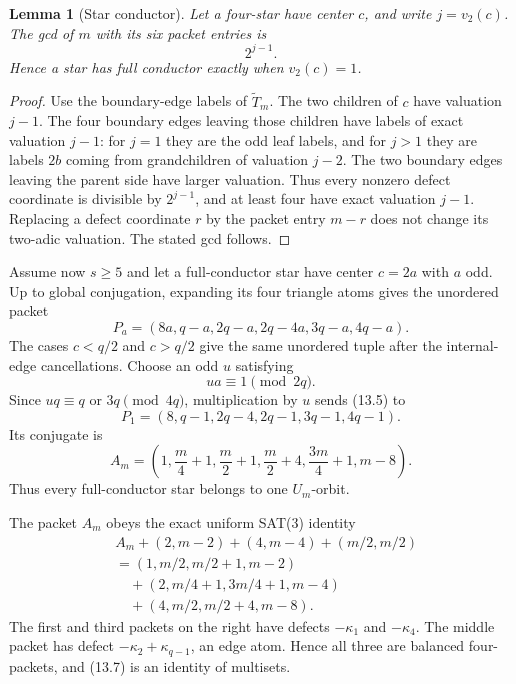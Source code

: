 \documentclass[11pt,oneside]{book}
\newtheorem{lemma}[theorem]{Lemma}
\theoremstyle{definition}
\theoremstyle{remark}
\begin{document}
\begin{lemma}[Star conductor]
Let a four-star have center \(c\), and write \(j=v_2(c)\). The gcd of \(m\) with its six packet entries is
\[
2^{j-1}.
\]
Hence a star has full conductor exactly when \(v_2(c)=1\).
\end{lemma}
\begin{proof}
Use the boundary-edge labels of \(\widetilde T_m\). The two children of \(c\) have valuation \(j-1\). The four boundary edges leaving those children have labels of exact valuation \(j-1\): for \(j=1\) they are the odd leaf labels, and for \(j>1\) they are labels \(2b\) coming from grandchildren of valuation \(j-2\). The two boundary edges leaving the parent side have larger valuation. Thus every nonzero defect coordinate is divisible by \(2^{j-1}\), and at least four have exact valuation \(j-1\). Replacing a defect coordinate \(r\) by the packet entry \(m-r\) does not change its two-adic valuation. The stated gcd follows.
\end{proof}

Assume now \(s\ge5\) and let a full-conductor star have center \(c=2a\) with \(a\) odd. Up to global conjugation, expanding its four triangle atoms gives the unordered packet
\[
P_a=
(8a,q-a,2q-a,2q-4a,3q-a,4q-a).
\tag{13.5}
\]
The cases \(c<q/2\) and \(c>q/2\) give the same unordered tuple after the internal-edge cancellations. Choose an odd \(u\) satisfying
\[
ua\equiv1\pmod{2q}.
\]
Since \(uq\equiv q\) or \(3q\pmod{4q}\), multiplication by \(u\) sends (13.5) to
\[
P_1=(8,q-1,2q-4,2q-1,3q-1,4q-1).
\]
Its conjugate is
\[
\boxed{
A_m=
\left(
1,\frac m4+1,\frac m2+1,\frac m2+4,
\frac{3m}4+1,m-8
\right).
}
\tag{13.6}
\]
Thus every full-conductor star belongs to one \(U_m\)-orbit.

The packet \(A_m\) obeys the exact uniform SAT(3) identity
\[
\begin{aligned}
&A_m+(2,m-2)+(4,m-4)+(m/2,m/2)\\
&=(1,m/2,m/2+1,m-2)\\
&\quad +(2,m/4+1,3m/4+1,m-4)\\
&\quad +(4,m/2,m/2+4,m-8).
\end{aligned}
\tag{13.7}
\]
The first and third packets on the right have defects \(-\kappa_1\) and \(-\kappa_4\). The middle packet has defect \(-\kappa_2+\kappa_{q-1}\), an edge atom. Hence all three are balanced four-packets, and (13.7) is an identity of multisets.
\end{document}
